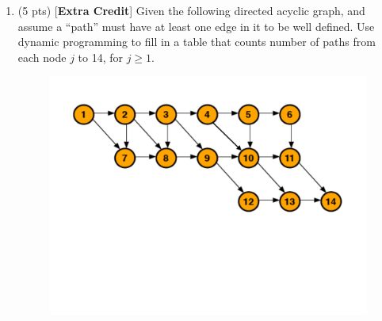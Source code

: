 \documentclass[12pt]{article}
\theoremstyle{remark}
\newtheorem*{solution}{Solution}
\begin{document}
\begin{enumerate}
\begin{enumerate}
    \item (2 pts) List out the optimal subset and provide it's weight and value.
    \begin{solution} Optimal Subset: \\ \\
\{A[0], A[1], A[3]\}, Weight = 10, Value = 9
    \end{solution}

\end{enumerate}
\pagebreak
    
        \item (5 pts) [\textbf{Extra Credit}] Given the following directed acyclic graph, and assume a ``path'' must have at least one edge in it to be well defined. Use dynamic programming to fill in a table that counts number of paths from each node $j$ to 14, for $j \geq 1$. 

        \begin{figure}[h!]
        \begin{center}
        \includegraphics[scale=0.45]{dag_ps9.pdf} 
        \end{center}
        \end{figure}
    

\end{enumerate}
\end{document}
